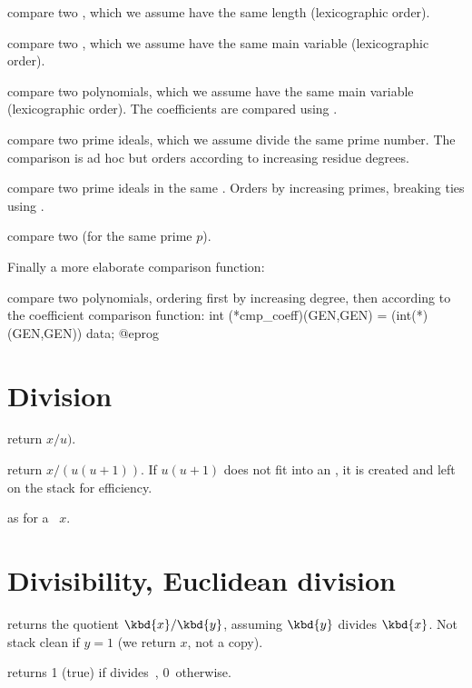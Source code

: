  compare two , which we assume have
the same length (lexicographic order).

 compare two , which we assume
have the same main variable (lexicographic order).

 compare two polynomials, which we assume
have the same main variable (lexicographic order). The coefficients are
compared using .

 compare two prime ideals, which
we assume divide the same prime number. The comparison is ad hoc but orders
according to increasing residue degrees.

 compare two prime ideals in the same
. Orders by increasing primes, breaking ties using
.

 compare two  (for the same
prime $p$).

Finally a more elaborate comparison function:

 compare two polynomials,
ordering first by increasing degree, then according to the coefficient
comparison function:
\bprog
  int (*cmp_coeff)(GEN,GEN) = (int(*)(GEN,GEN)) data;
@eprog

\section{Division}

 return $x/u)$.

 return $x/(u(u+1))$. If $u(u+1)$
does not fit into an , it is created and left on the stack for efficiency.

 as  for a
~$x$.

\section{Divisibility, Euclidean division}

 returns the quotient $\kbd{x} / \kbd{y}$,
assuming $\kbd{y}$ divides $\kbd{x}$. Not stack clean if $y = 1$
(we return $x$, not a copy).

  returns 1 (true) if  divides~,
0~otherwise.

